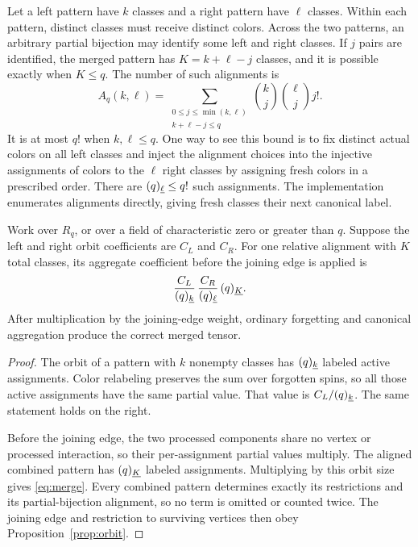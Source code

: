 Let a left pattern have $k$ classes and a right pattern have $\ell$ classes.
Within each pattern, distinct classes must receive distinct colors.
Across the two patterns, an arbitrary partial bijection may identify
some left and right classes. If $j$ pairs are identified, the merged pattern
has $K=k+\ell-j$ classes, and it is possible exactly when $K\le q$.
The number of such alignments is
\begin{equation}
 A_q(k,\ell)=
 \sum_{\substack{0\le j\le\min(k,\ell)\\k+\ell-j\le q}}
 \binom{k}{j}\binom{\ell}{j}j!.
 \label{eq:alignments}
\end{equation}
It is at most $q!$ when $k,\ell\le q$. One way to see this bound is to fix
distinct actual colors on all left classes and inject the alignment choices
into the injective assignments of colors to the $\ell$ right classes by
assigning fresh colors in a prescribed order. There are
$(q)_{\underline{\ell}}\le q!$ such assignments. The implementation enumerates
alignments directly, giving fresh classes their next canonical label.

\begin{theorem}\label{thm:merge}
Work over $R_q$, or over a field of characteristic zero or greater than $q$.
Suppose the left and right orbit coefficients are $C_L$ and $C_R$.
For one relative alignment with $K$ total classes, its aggregate coefficient
before the joining edge is applied is
\begin{equation}
 \frac{C_L}{(q)_{\underline{k}}}\,
 \frac{C_R}{(q)_{\underline{\ell}}}\,
 (q)_{\underline{K}}.
 \label{eq:merge}
\end{equation}
After multiplication by the joining-edge weight, ordinary forgetting
and canonical aggregation produce the correct merged tensor.
\end{theorem}
\begin{proof}
The orbit of a pattern with $k$ nonempty classes has
$(q)_{\underline{k}}$ labeled active assignments. Color relabeling preserves the
sum over forgotten spins, so all those active assignments have the same
partial value. That value is $C_L/(q)_{\underline{k}}$. The same statement holds
on the right.

Before the joining edge, the two processed components share no vertex or
processed interaction, so their per-assignment partial values multiply.
The aligned combined pattern has $(q)_{\underline{K}}$ labeled assignments.
Multiplying by this orbit size gives \eqref{eq:merge}.
Every combined pattern determines exactly its restrictions and its
partial-bijection alignment, so no term is omitted or counted twice.
The joining edge and restriction to surviving vertices then obey
Proposition~\ref{prop:orbit}.
\end{proof}

